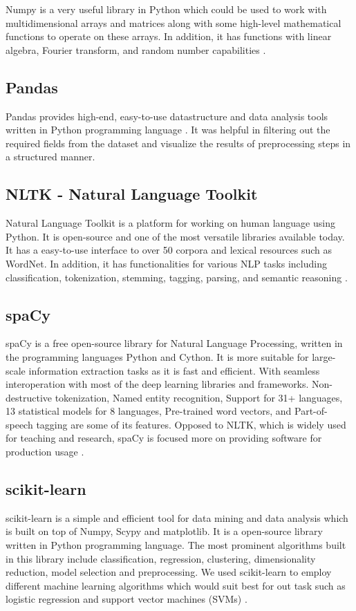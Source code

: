 Numpy is a very useful library in Python which could be used to work with multidimensional arrays and matrices along with some high-level mathematical functions to operate on these arrays. In addition, it has functions with linear algebra, Fourier transform, and random number capabilities \cite{numpy}.

\subsection{Pandas}

Pandas provides high-end, easy-to-use datastructure and data analysis tools written in Python programming language \cite{pandas}. It was helpful in filtering out the required fields from the dataset and visualize the results of preprocessing steps in a structured manner.  

\subsection{NLTK - Natural Language Toolkit}

Natural Language Toolkit is a platform for working on human language using Python. It is open-source and one of the most versatile libraries available today. It has a easy-to-use interface to over 50 corpora and lexical resources such as WordNet. In addition, it has functionalities for various NLP tasks including  classification, tokenization, stemming, tagging, parsing, and semantic reasoning \cite{nltk}.

\subsection{spaCy}

spaCy is a free open-source library for Natural Language Processing, written in the programming languages Python and Cython. It is more suitable for large-scale information extraction tasks as it is fast and efficient. With seamless interoperation with most of the deep learning libraries and frameworks. Non-destructive tokenization, Named entity recognition, Support for 31+ languages, 13 statistical models for 8 languages, Pre-trained word vectors, and Part-of-speech tagging are some of its features. Opposed to NLTK, which is widely used for teaching and research, spaCy is focused more on providing software for production usage \cite{spacy}.

\subsection{scikit-learn}

scikit-learn is a simple and efficient tool for data mining and data analysis which is built on top of Numpy, Scypy and matplotlib. It is a open-source library written in Python programming language. The most prominent algorithms built in this library include classification, regression, clustering, dimensionality reduction, model selection and preprocessing. We used scikit-learn to employ different machine learning algorithms which would suit best for out task such as logistic regression and support vector machines (SVMs) \cite{scikit_learn}. 